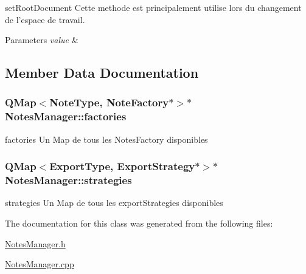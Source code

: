 set\-Root\-Document Cette methode est principalement utilise lors du changement de l'espace de travail. 


\begin{DoxyParams}{Parameters}
{\em value} & \\
\hline
\end{DoxyParams}


\subsection{Member Data Documentation}
\hypertarget{class_notes_manager_acc3391f8fb05d1dd36bce98620915574}{
\subsubsection[{factories}]{\setlength{\rightskip}{0pt plus 5cm}Q\-Map$<${\bf Note\-Type}, {\bf Note\-Factory}$\ast$$>$$\ast$ Notes\-Manager\-::factories}}\label{class_notes_manager_acc3391f8fb05d1dd36bce98620915574}


factories Un Map de tous les Notes\-Factory disponibles 

\hypertarget{class_notes_manager_a76009ca9ef3ceaf21dfb51fbe796b7ff}{
\subsubsection[{strategies}]{\setlength{\rightskip}{0pt plus 5cm}Q\-Map$<${\bf Export\-Type}, {\bf Export\-Strategy}$\ast$$>$$\ast$ Notes\-Manager\-::strategies}}\label{class_notes_manager_a76009ca9ef3ceaf21dfb51fbe796b7ff}


strategies Un Map de tous les export\-Strategies disponibles 



The documentation for this class was generated from the following files\-:\begin{DoxyCompactItemize}
\item 
\hyperlink{_notes_manager_8h}{Notes\-Manager.\-h}\item 
\hyperlink{_notes_manager_8cpp}{Notes\-Manager.\-cpp}\end{DoxyCompactItemize}
